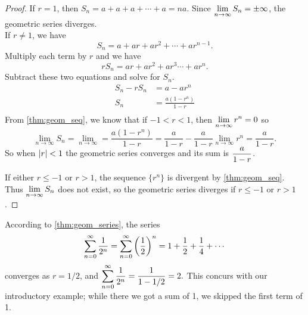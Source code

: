 \begin{proof}
If $r=1$, then $S_n=a+a+a+\dotsb+a=na$. Since $\displaystyle\lim_{n\to \infty} S_n=\pm \infty$, the geometric series diverges.\\
If $r\neq 1$, we have
\[S_n=a+ar+ar^2+\dotsb+ar^{n-1}.\]
Multiply each term by $r$ and we have 
\[rS_n=ar+ar^2+ar^3\dotsb+ar^n.\]
Subtract these two equations and solve for $S_n$.
\begin{align*}
S_n-rS_n &=a-ar^n \\
S_n &=\frac{a(1-r^n)}{1-r}\\
\end{align*}
From \autoref{thm:geom_seq}, we know that if $-1<r<1$, then $\displaystyle \lim_{n\to \infty} r^n=0$ so
\[
\lim_{n\to \infty} S_n=\lim_{n\to \infty}=\frac{a(1-r^n)}{1-r}
=\frac{a}{1-r}- \frac{a}{1-r}\lim_{n\to \infty}r^n=\frac{a}{1-r}.
\]
So when $\left\lvert r \right\rvert<1$ the geometric series converges and its sum is $\displaystyle \frac{a}{1-r}$.

If either $r\leq -1$ or $r>1$, the sequence $\{r^n\}$ is divergent by \autoref{thm:geom_seq}. Thus $\displaystyle \lim_{n\to \infty} S_n$ does not exist, so the geometric series diverges if $r\leq -1$ or \mbox{$r>1$.} %
\end{proof}

According to \autoref{thm:geom_series}, the series 
\[
\displaystyle\sum_{n=0}^\infty \frac{1}{2^n}
=\sum_{n=0}^\infty \left(\frac 12\right)^n= 1+\frac12+\frac14+\dotsb
\]
converges as $r=1/2$, and $\displaystyle \sum_{n=0}^\infty \frac{1}{2^n} = \frac{1}{1-1/2} = 2.$ This concurs with our introductory example; while there we got a sum of 1, we skipped the first term of 1.

